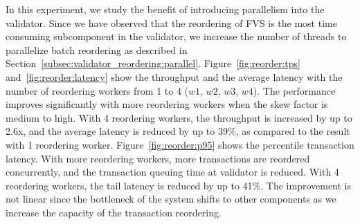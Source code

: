 In this experiment, we study the benefit of introducing parallelism into the validator. Since we have observed that the reordering of FVS is the most time consuming subcomponent in the validator, we increase the number of threads to parallelize batch reordering as described in Section~\ref{subsec:validator_reordering:parallel}. 
Figure~\ref{fig:reorder:tps} and~\ref{fig:reorder:latency} show the throughput
and the average latency with the number of reordering workers from 1 to 4
($w1$, $w2$, $w3$, $w4$). The performance improves significantly with more reordering workers when the skew factor is medium to high. With 4 reordering workers, the throughput is increased by up to 2.6x, and the average latency is reduced by up to 39\%, as compared to the result with 1 reordering worker. Figure~\ref{fig:reorder:p95} shows the percentile transaction latency. With more reordering workers, more transactions are reordered concurrently, and the transaction queuing time at validator is reduced. With 4 reordering workers, the tail latency is reduced by up to 41\%. The improvement is not linear since the bottleneck of the system shifts to other
components as we increase the capacity of the transaction reordering.

